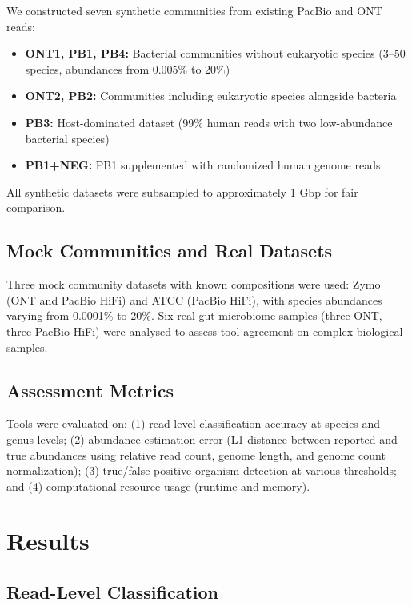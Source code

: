 \documentclass[11pt]{article}
\begin{document}
We constructed seven synthetic communities from existing PacBio and ONT reads:
\begin{itemize}
\item \textbf{ONT1, PB1, PB4:} Bacterial communities without eukaryotic species (3--50 species, abundances from 0.005\% to 20\%)
\item \textbf{ONT2, PB2:} Communities including eukaryotic species alongside bacteria
\item \textbf{PB3:} Host-dominated dataset (99\% human reads with two low-abundance bacterial species)
\item \textbf{PB1+NEG:} PB1 supplemented with randomized human genome reads
\end{itemize}

All synthetic datasets were subsampled to approximately 1 Gbp for fair comparison.

\subsection{Mock Communities and Real Datasets}

Three mock community datasets with known compositions were used: Zymo (ONT and PacBio HiFi) and ATCC (PacBio HiFi), with species abundances varying from 0.0001\% to 20\%. Six real gut microbiome samples (three ONT, three PacBio HiFi) were analysed to assess tool agreement on complex biological samples.

\subsection{Assessment Metrics}

Tools were evaluated on: (1) read-level classification accuracy at species and genus levels; (2) abundance estimation error (L1 distance between reported and true abundances using relative read count, genome length, and genome count normalization); (3) true/false positive organism detection at various thresholds; and (4) computational resource usage (runtime and memory).

\section{Results}

\subsection{Read-Level Classification}
\end{document}
